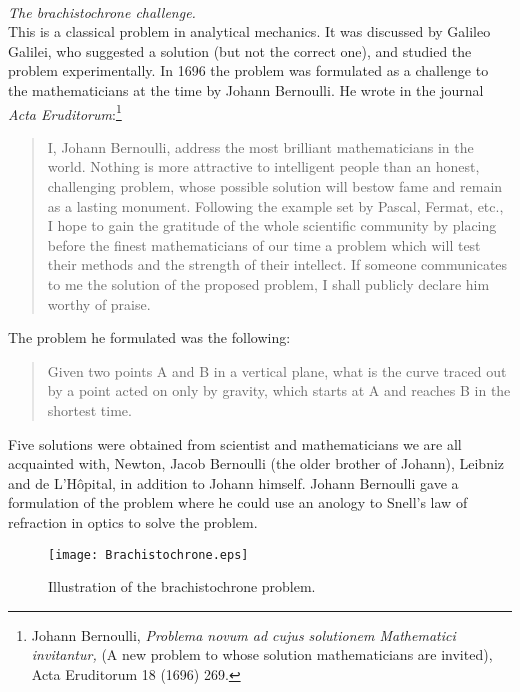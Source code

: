 \documentclass[11pt,a4paper]{report}
\newcounter{excount}[chapter]
\newenvironment{exercise}[1][]{\addtocounter{excount}{1} \noindent {\bf Problem
    \arabic{excount} \ \ #1}\hspace{2mm}}{\vspace{4mm}}
\begin{document}
\begin{exercise}[Midterm Exam 2008]\\
{\em The brachistochrone challenge.}\\
This is a classical problem in analytical mechanics. It was discussed by Galileo Galilei, who suggested a solution (but not the correct one), and studied the problem experimentally. In 1696 the problem was formulated as a challenge to the mathematicians at the time by Johann Bernoulli. He wrote in the journal {\em Acta Eruditorum}:\footnote{Johann Bernoulli, {\em Problema novum ad cujus solutionem Mathematici invitantur,} (A new problem to whose solution mathematicians are invited), Acta Eruditorum 18 (1696) 269.}

\begin{quote}
I, Johann Bernoulli, address the most brilliant mathematicians in the world. Nothing is more
attractive to intelligent people than an honest, challenging problem, whose possible solution
will bestow fame and remain as a lasting monument. Following the example set by Pascal,
Fermat, etc., I hope to gain the gratitude of the whole scientific community by placing
before the finest mathematicians of our time a problem which will test their methods and the
strength of their intellect. If someone communicates to me the solution of the proposed
problem, I shall publicly declare him worthy of praise.
\end{quote}

The problem he formulated was the following:

\begin{quote}
Given two points A and B in a vertical plane, what is the curve traced out by a point acted
on only by gravity, which starts at A and reaches B in the shortest time.
\end{quote}

Five solutions were obtained from scientist and mathematicians we are all acquainted with, Newton,
Jacob Bernoulli (the older brother of Johann), Leibniz and de L'H{\^o}pital, in addition to Johann himself. Johann Bernoulli gave a formulation of the problem where he could use an anology to Snell's law of refraction in optics to solve the problem.

\begin{figure}[h]
\begin{center}
\texttt{[image: Brachistochrone.eps]}
\end{center}
\caption{Illustration of the brachistochrone problem.}
\label{fig:brach}
\end{figure}


\end{exercise}
\end{document}
